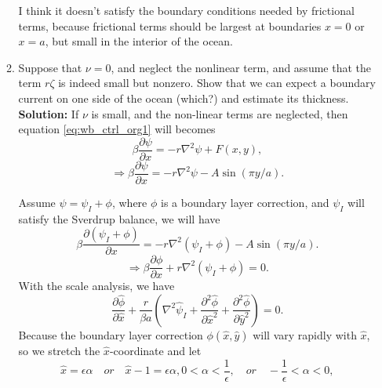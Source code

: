 \documentclass[a4paper]{article}
\begin{document}
\begin{enumerate}[label=\textbf{\arabic*.}]
\begin{enumerate}[label=\textbf{(\alph*)}]
		I think it doesn't satisfy the boundary conditions needed by frictional terms, because frictional terms should be largest at boundaries $x=0$ or $x=a$, but small in the interior of the ocean.\\
		
		
		\item Suppose that $\nu = 0$, and neglect the nonlinear term, and assume that the term $r\zeta$ is indeed small but nonzero. Show that we can expect a boundary current on one
side of the ocean (which?) and estimate its thickness.\\
		
		\textbf{Solution:} If $\nu$ is small, and the non-linear terms are neglected, then equation \eqref{eq:wb_ctrl_org1} will becomes
		$$\beta \frac{\partial \psi}{\partial x} = -r\nabla^{2}\psi+ F(x ,y ),$$
		$$\Longrightarrow \beta \frac{\partial \psi}{\partial x} = -r\nabla^{2}\psi-A\sin (\pi y/a).$$
		
		Assume $\psi=\psi_I+\phi$, where $\phi$ is a boundary layer correction, and $\psi_I$ will satisfy the Sverdrup balance, we will have
		$$\beta \frac{\partial (\psi_I+\phi)}{\partial x} = -r\nabla^{2}(\psi_I+\phi)-A\sin (\pi y/a).$$
		$$\Longrightarrow \beta \frac{\partial \phi}{\partial x} +r\nabla^{2}(\psi_I+\phi) = 0.$$
		With the scale analysis, we have
		\begin{equation}\label{eq:phi}
			\frac{\partial \hat{\phi}}{\partial \hat{x}} +\frac{r}{\beta a} \left(\nabla^2 \hat{\psi}_I+ \frac{\partial^2 \hat{\phi}}{\partial\hat{x}^2} + \frac{\partial^2 \hat{\phi}}{ \partial \hat{y}^2} \right) = 0.
		\end{equation}		
		Because the boundary layer correction $\phi(\hat{x},\hat{y})$ will vary rapidly with $\hat{x}$, so we stretch the $\hat{x}$-coordinate and let
		\begin{subequations}\label{eq:coordinate_stretch}
			\begin{equation}
				\hat{x}=\epsilon \alpha \quad or \quad \hat{x}-1=\epsilon\alpha,
			\end{equation}
			\begin{equation}
				0<\alpha<\frac{1}{\epsilon}, \quad or \quad -\frac{1}{\epsilon}<\alpha<0,
			\end{equation}
		\end{subequations}
		

\end{enumerate}
\end{enumerate}
\end{document}
